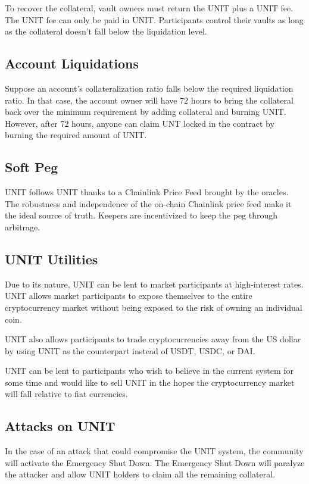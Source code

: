 \documentclass[12pt]{article}
\begin{document}
To recover the collateral, vault owners must return the UNIT plus a UNIT fee. The UNIT  fee can only be paid in UNIT. Participants control their vaults as long as the collateral doesn’t fall below the liquidation level. 


\subsection{Account Liquidations}

Suppose an account's collateralization ratio falls below the required liquidation ratio. In that case, the account owner will have 72 hours to bring the collateral back over the minimum requirement by adding collateral and burning UNIT. However, after 72 hours, anyone can claim UNT locked in the contract by burning the required amount of UNIT.


\subsection{Soft Peg}

UNIT follows UNIT thanks to a Chainlink Price Feed brought by the oracles. The robustness and independence of the on-chain Chainlink price feed make it the ideal source of truth. Keepers are incentivized to keep the peg through arbitrage.


\subsection{UNIT Utilities}

Due to its nature, UNIT can be lent to market participants at high-interest rates. UNIT allows market participants to expose themselves to the entire cryptocurrency market without being exposed to the risk of owning an individual coin. 

UNIT also allows participants to trade cryptocurrencies away from the US dollar by using UNIT as the counterpart instead of USDT, USDC, or DAI.

UNIT can be lent to participants who wish to believe in the current system for some time and would like to sell UNIT in the hopes the cryptocurrency market will fall relative to fiat currencies.



\subsection{Attacks on UNIT}

In the case of an attack that could compromise the UNIT system, the community will activate the Emergency Shut Down. The Emergency Shut Down will paralyze the attacker and allow UNIT holders to claim all the remaining collateral.
\end{document}
